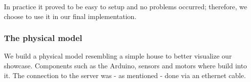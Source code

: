 \documentclass{article}
\begin{document}
In practice it proved to be easy to setup and no problems occurred; therefore, we choose to use it in our final implementation.

\subsubsection{The physical model}

We build a physical model resembling a simple house to better visualize our showcase. Components such as the Arduino, sensors and motors where build into it. The connection to the server was - as mentioned - done via an ethernet cable.



\printbibliography
\end{document}
